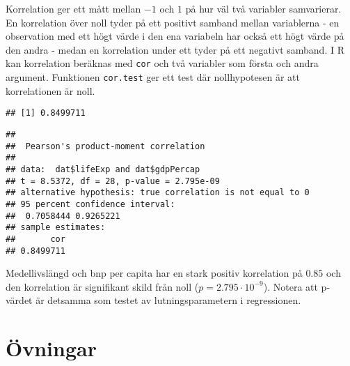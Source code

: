 \documentclass[
]{book}
\newenvironment{Shaded}{\begin{snugshade}}{\end{snugshade}}
\newcommand{\FunctionTok}[1]{\textcolor[rgb]{0.00,0.00,0.00}{#1}}
\newcommand{\NormalTok}[1]{#1}
\newcommand{\SpecialCharTok}[1]{\textcolor[rgb]{0.00,0.00,0.00}{#1}}
\theoremstyle{definition}
\theoremstyle{definition}
\theoremstyle{definition}
\theoremstyle{definition}
\theoremstyle{remark}
\begin{document}
Korrelation ger ett mått mellan \(-1\) och \(1\) på hur väl två variabler samvarierar. En korrelation över noll tyder på ett positivt samband mellan variablerna - en observation med ett högt värde i den ena variabeln har också ett högt värde på den andra - medan en korrelation under ett tyder på ett negativt samband. I R kan korrelation beräknas med \texttt{cor} och två variabler som första och andra argument. Funktionen \texttt{cor.test} ger ett test där nollhypotesen är att korrelationen är noll.

\begin{Shaded}
\end{Shaded}

\begin{verbatim}
## [1] 0.8499711
\end{verbatim}

\begin{Shaded}
\end{Shaded}

\begin{verbatim}
## 
##  Pearson's product-moment correlation
## 
## data:  dat$lifeExp and dat$gdpPercap
## t = 8.5372, df = 28, p-value = 2.795e-09
## alternative hypothesis: true correlation is not equal to 0
## 95 percent confidence interval:
##  0.7058444 0.9265221
## sample estimates:
##       cor 
## 0.8499711
\end{verbatim}

Medellivslängd och bnp per capita har en stark positiv korrelation på \(0.85\) och den korrelation är signifikant skild från noll (\(p = 2.795 \cdot 10^{-9}\)). Notera att p-värdet är detsamma som testet av lutningsparametern i regressionen.

\hypertarget{uxf6vningar-5}{%
\section{Övningar}\label{uxf6vningar-5}}
\end{document}
